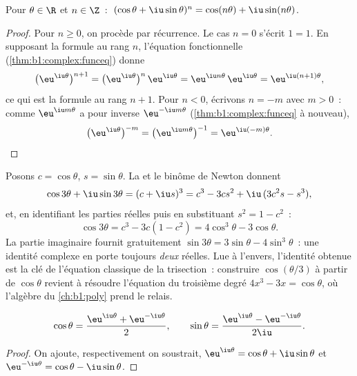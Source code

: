\begin{corollary}\label{cor:b1:complex:demoivre}
Pour $\theta \in \R$ et $n \in \Z$~:
$\;(\cos\theta + \iu\sin\theta)^n = \cos(n\theta) +
\iu\sin(n\theta)$.
\end{corollary}

\begin{proof}
Pour $n \geq 0$, on procède par récurrence. Le cas $n = 0$ s'écrit
$1 = 1$. En supposant la formule au rang $n$, l'équation
fonctionnelle (\cref{thm:b1:complex:funceq}) donne
\[
\bigl(\eu^{\iu\theta}\bigr)^{n+1}
= \bigl(\eu^{\iu\theta}\bigr)^{n}\,\eu^{\iu\theta}
= \eu^{\iu n\theta}\,\eu^{\iu\theta}
= \eu^{\iu(n+1)\theta} ,
\]
ce qui est la formule au rang $n + 1$. Pour $n < 0$, écrivons $n =
-m$ avec $m > 0$~: comme $\eu^{\iu m\theta}$ a pour inverse
$\eu^{-\iu m\theta}$ (\cref{thm:b1:complex:funceq} à nouveau),
\[
\bigl(\eu^{\iu\theta}\bigr)^{-m}
= \bigl(\eu^{\iu m\theta}\bigr)^{-1}
= \eu^{\iu(-m)\theta} . \qedhere
\]
\end{proof}

\begin{example}\label{ex:b1:complex:cos3}
Posons $c = \cos\theta$, $s = \sin\theta$. La  et
le binôme de Newton donnent
\[
\cos 3\theta + \iu \sin 3\theta = (c + \iu s)^3
= c^3 - 3cs^2 + \iu\,(3c^2 s - s^3),
\]
et, en identifiant les parties réelles puis en substituant $s^2 = 1
- c^2$~:
\[
\cos 3\theta = c^3 - 3c(1 - c^2) = 4\cos^3\theta - 3\cos\theta .
\]
La partie imaginaire fournit gratuitement $\sin 3\theta =
3\sin\theta - 4\sin^3\theta$~: une identité complexe en porte
toujours \emph{deux} réelles. Lue à l'envers, l'identité obtenue
est la clé de l'équation classique de la trisection~: construire
$\cos(\theta/3)$ à partir de $\cos\theta$ revient à résoudre
l'équation du troisième degré $4x^3 - 3x = \cos\theta$, où
l'algèbre du \cref{ch:b1:poly} prend le relais.
\end{example}

\begin{proposition}\label{prop:b1:complex:euler}
\[
\cos\theta = \frac{\eu^{\iu\theta} + \eu^{-\iu\theta}}{2},
\qquad
\sin\theta = \frac{\eu^{\iu\theta} - \eu^{-\iu\theta}}{2\iu}.
\]
\end{proposition}

\begin{proof}
On ajoute, respectivement on soustrait, $\eu^{\iu\theta} = \cos\theta +
\iu\sin\theta$ et $\eu^{-\iu\theta} = \cos\theta - \iu\sin\theta$.
\end{proof}

